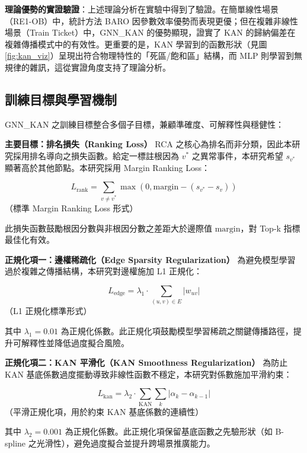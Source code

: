 \documentclass[10pt,a4paper,twocolumn]{article}
\begin{document}
\textbf{理論優勢的實證驗證}：上述理論分析在實驗中得到了驗證。在簡單線性場景（RE1-OB）中，統計方法 BARO 因參數效率優勢而表現更優；但在複雜非線性場景（Train Ticket）中，GNN\_KAN 的優勢顯現，證實了 KAN 的歸納偏差在複雜傳播模式中的有效性。更重要的是，KAN 學習到的函數形狀（見圖 \ref{fig:kan_viz}）呈現出符合物理特性的「死區/飽和區」結構，而 MLP 則學習到無規律的雜訊，這從實證角度支持了理論分析。

\subsection{訓練目標與學習機制}

GNN\_KAN 之訓練目標整合多個子目標，兼顧準確度、可解釋性與穩健性：

\textbf{主要目標：排名損失（Ranking Loss）}  
RCA 之核心為排名而非分類，因此本研究採用排名導向之損失函數。給定一標註根因為 $v^*$ 之異常事件，本研究希望 $s_{v^*}$ 顯著高於其他節點。本研究採用 Margin Ranking Loss：

\begin{equation}
L_{\text{rank}} = \sum_{v \neq v^*} \max(0, \text{margin} - (s_{v^*} - s_v))
\end{equation}
（標準 Margin Ranking Loss 形式）

此損失函數鼓勵根因分數與非根因分數之差距大於邊際值 $\text{margin}$，對 Top-k 指標最佳化有效。

\textbf{正規化項一：邊權稀疏化（Edge Sparsity Regularization）}  
為避免模型學習過於複雜之傳播結構，本研究對邊權施加 L1 正規化：

\begin{equation}
L_{\text{edge}} = \lambda_1 \cdot \sum_{(u,v)\in E} |w_{uv}|
\end{equation}
（L1 正規化標準形式）

其中 $\lambda_1=0.01$ 為正規化係數。此正規化項鼓勵模型學習稀疏之關鍵傳播路徑，提升可解釋性並降低過度擬合風險。

\textbf{正規化項二：KAN 平滑化（KAN Smoothness Regularization）}  
為防止 KAN 基底係數過度擺動導致非線性函數不穩定，本研究對係數施加平滑約束：

\begin{equation}
L_{\text{kan}} = \lambda_2 \cdot \sum_{\text{KAN}} \sum_k |\alpha_k - \alpha_{k-1}|
\end{equation}
（平滑正規化項，用於約束 KAN 基底係數的連續性）

其中 $\lambda_2=0.001$ 為正規化係數。此正規化項保留基底函數之先驗形狀（如 B-spline 之光滑性），避免過度擬合並提升跨場景推廣能力。
\end{document}
